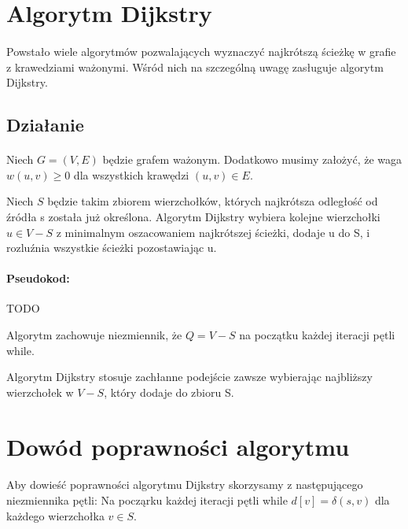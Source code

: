 \section{Algorytm Dijkstry}

\paragraph{}Powstało wiele algorytmów pozwalających wyznaczyć najkrótszą ścieżkę w grafie z
krawedziami ważonymi. Wśród nich na szczególną uwagę zasługuje algorytm Dijkstry.

\subsection{Działanie}

\paragraph{}Niech $G = (V, E)$ będzie grafem ważonym. Dodatkowo musimy założyć, że waga $w(u,v) \ge 0$
dla wszystkich krawędzi $(u, v) \in E$.

Niech $S$ będzie takim zbiorem wierzchołków, których najkrótsza odległość od źródła
s została już określona. Algorytm Dijkstry wybiera kolejne wierzchołki $u \in V - S$
z minimalnym oszacowaniem najkrótszej ścieżki, dodaje u do S, i rozluźnia wszystkie ścieżki pozostawiając u.

\paragraph{Pseudokod:}
TODO

Algorytm zachowuje niezmiennik, że $Q = V - S$ na początku każdej iteracji pętli while.

Algorytm Dijkstry stosuje zachłanne podejście zawsze wybierając najbliższy wierzchołek
w $V - S$, który dodaje do zbioru S.

\section{Dowód poprawności algorytmu}

\paragraph{}Aby dowieść poprawności algorytmu Dijkstry skorzysamy z następującego niezmiennika pętli:
Na począrku każdej iteracji pętli while $d[v] = \delta(s,v)$ dla każdego wierzchołka $v \in S$.

